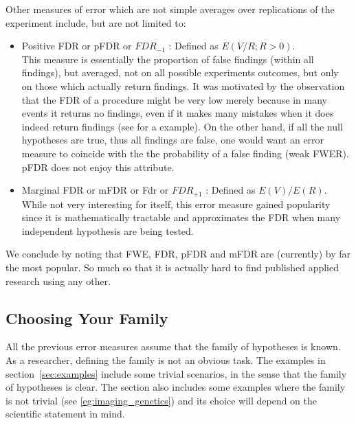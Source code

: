 \documentclass[review,12pt]{article}
\begin{document}
Other measures of error which are not simple averages over replications of the experiment include, but are not limited to:
\begin{itemize}

\item Positive FDR or pFDR \citep{storey_direct_2002} or $FDR_{-1}$ \citep{benjamini_discovering_2010} : Defined as $E(V/R;R>0)$.\\
This measure is essentially the proportion of false findings (within all findings), but averaged, not on all possible experiments outcomes, but only on those which actually return findings. It was motivated by the observation that the FDR of a procedure might be very low merely because in many events it returns no findings, even if it makes many mistakes when it does indeed return findings (see \citep{storey_direct_2002} for a example). 
On the other hand, if all the null hypotheses are true, thus all findings are false, one would want an error measure to coincide with the the probability of a false finding (weak FWER). pFDR does not enjoy this attribute.

\item Marginal FDR or mFDR \citep{sun_oracle_2007} or Fdr \citep{efron_microarrays_2008} or $FDR_{+1}$ \citep{benjamini_discovering_2010}: Defined as $E(V)/E(R)$. \\
While not very interesting for itself, this error measure gained popularity since it is mathematically tractable and approximates the FDR when many independent hypothesis are being tested. 

\end{itemize}


We conclude by noting that FWE, FDR, pFDR and mFDR are (currently) by far the most popular. So much so that it is actually hard to find published applied research using any other. 



\subsection{Choosing Your Family}
All the previous error measures assume that the family of hypotheses is known. As a researcher, defining the family is not an obvious task. The examples in section~\ref{sec:examples} include some trivial scenarios, in the sense that the family of hypotheses is clear. The section also includes some examples where the family is not trivial (see \ref{eg:imaging_genetics}) and its choice will depend on the scientific statement in mind.
\end{document}
